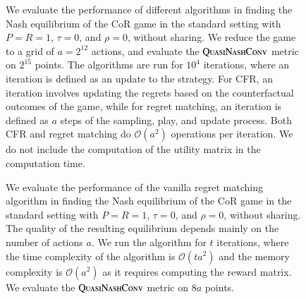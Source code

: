 \documentclass[preprint,12pt,authoryear]{elsarticle}
\theoremstyle{definition}
\begin{document}
\begin{figure}[htbp]
  \centering
  \begin{minipage}[t]{0.48\textwidth}
    \centering
    
  \end{minipage}
  \hfill
  \begin{minipage}[t]{0.48\textwidth}
    \centering
    
  \end{minipage}
  \caption{We evaluate the performance of different algorithms in finding the Nash equilibrium of the CoR game in the standard setting with $P=R=1$, $\tau=0$, and $\rho=0$, without sharing. We reduce the game to a grid of $a=2^{12}$ actions, and evaluate the $\textsc{QuasiNashConv}$ metric on $2^{15}$ points. The algorithms are run for $10^4$ iterations, where an iteration is defined as an update to the strategy. For CFR, an iteration involves updating the regrets based on the counterfactual outcomes of the game, while for regret matching, an iteration is defined as $a$ steps of the sampling, play, and update process. Both CFR and regret matching do $\mathcal{O}(a^2)$ operations per iteration. We do not include the computation of the utility matrix in the computation time.}
  \label{fig:rm-different}  
\end{figure}




\begin{figure}[htbp]
  \centering
  \begin{minipage}[t]{0.48\textwidth}
    \centering
    
  \end{minipage}
  \hfill
  \begin{minipage}[t]{0.48\textwidth}
    \centering
    
  \end{minipage}
  \caption{We evaluate the performance of the vanilla regret matching algorithm in finding the Nash equilibrium of the CoR game in the standard setting with $P=R=1$, $\tau=0$, and $\rho=0$, without sharing. The quality of the resulting equilibrium depends mainly on the number of actions $a$. We run the algorithm for $t$ iterations, where the time complexity of the algorithm is $\mathcal{O}(t a^2)$ and the memory complexity is $\mathcal{O}(a^2)$ as it requires computing the reward matrix. We evaluate the $\textsc{QuasiNashConv}$ metric on $8a$ points.}
  \label{fig:rm-size}  
\end{figure}
\end{document}
